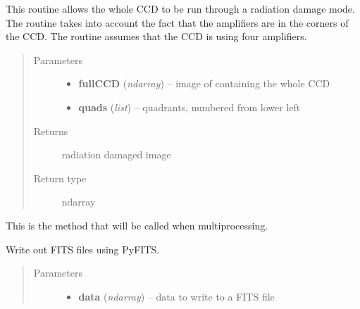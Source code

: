 \documentclass[a4paper,12pt,english]{sphinxmanual}
\begin{document}
\begin{fulllineitems}
\begin{fulllineitems}
\label{postproc:postproc.postprocessing.PostProcessing.radiateFullCCD}
This routine allows the whole CCD to be run through a radiation damage mode.
The routine takes into account the fact that the amplifiers are in the corners
of the CCD. The routine assumes that the CCD is using four amplifiers.
\begin{quote}\begin{description}
\item[{Parameters}] \leavevmode\begin{itemize}
\item {} 
\textbf{fullCCD} (\emph{ndarray}) -- image of containing the whole CCD

\item {} 
\textbf{quads} (\emph{list}) -- quadrants, numbered from lower left

\end{itemize}

\item[{Returns}] \leavevmode
radiation damaged image

\item[{Return type}] \leavevmode
ndarray

\end{description}\end{quote}

\end{fulllineitems}


\begin{fulllineitems}
\label{postproc:postproc.postprocessing.PostProcessing.run}
This is the method that will be called when multiprocessing.

\end{fulllineitems}


\begin{fulllineitems}
\label{postproc:postproc.postprocessing.PostProcessing.writeFITSfile}
Write out FITS files using PyFITS.
\begin{quote}\begin{description}
\item[{Parameters}] \leavevmode\begin{itemize}
\item {} 
\textbf{data} (\emph{ndarray}) -- data to write to a FITS file


\end{itemize}
\end{description}
\end{quote}
\end{fulllineitems}
\end{fulllineitems}
\end{document}
